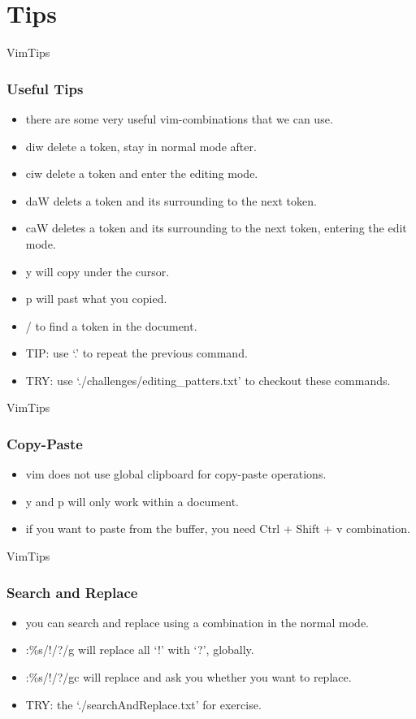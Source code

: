 \documentclass{beamer}
\begin{document}
\section{Tips}
\begin{frame}{VimTips}
    \frametitle{Useful Tips}
    \begin{itemize}
        \item there are some very useful vim-combinations that we can use.
        \item \textsf{diw} delete a token, stay in normal mode after.
        \item \textsf{ciw} delete a token and enter the editing mode.
        \item \textsf{daW} delets a token and its surrounding to the next token.
        \item \textsf{caW} deletes a token and its surrounding to the next token, entering the edit mode.
        \item \textsf{y} will copy under the cursor.
        \item \textsf{p} will past what you copied.
        \item \textsf{/} to find a token in the document.
        \item TIP: use `.' to repeat the previous command.
        \item TRY: use `./challenges/editing\_patters.txt' to checkout these commands.
    \end{itemize}
\end{frame}

\begin{frame}{VimTips}
    \frametitle{Copy-Paste}
    \begin{itemize}
        \item vim does not use global clipboard for copy-paste operations.
        \item \textsf{y} and \textsf{p} will only work within a document.
        \item if you want to paste from the buffer, you need \textsf{Ctrl} + \textsf{Shift} + \textsf{v} combination.
    \end{itemize}
\end{frame}

\begin{frame}{VimTips}
    \frametitle{Search and Replace}
    \begin{itemize}
        \item you can search and replace using a combination in the normal mode.
        \item \textsf{:\%s/!/?/g} will replace all `!' with `?', globally.
        \item \textsf{:\%s/!/?/gc} will replace and ask you whether you want to replace.
        \item TRY: the `./searchAndReplace.txt' for exercise.
    \end{itemize}
\end{frame}
\end{document}
